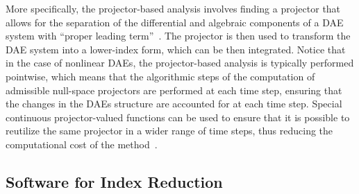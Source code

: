 More specifically, the projector-based analysis involves finding a projector that allows for the separation of the differential and algebraic components of a \ac{DAE} system with ``proper leading term''~\cite{lamour2011computational}. The projector is then used to transform the \ac{DAE} system into a lower-index form, which can be then integrated. Notice that in the case of nonlinear \acp{DAE}, the projector-based analysis is typically performed pointwise, which means that the algorithmic steps of the computation of admissible null-space projectors are performed at each time step, ensuring that the changes in the \acp{DAE} structure are accounted for at each time step. Special continuous projector-valued functions can be used to ensure that it is possible to reutilize the same projector in a wider range of time steps, thus reducing the computational cost of the method~\cite{lamour2012detecting}.

\subsection{Software for Index Reduction}

